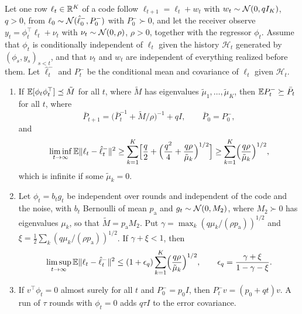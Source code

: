 \begin{theorem}\label{thm:lrn-tracking}
Let one row $\ell_t\in\mathbb{R}^K$ of a code follow $\ell_{t+1}=\ell_t+w_t$ with $w_t\sim\mathcal{N}(0,qI_K)$, $q>0$, from $\ell_0\sim\mathcal{N}(\hat\ell^-_0,P^-_0)$ with $P^-_0\succ0$, and let the receiver observe $y_t=\phi_t^\top\ell_t+\nu_t$ with $\nu_t\sim\mathcal{N}(0,\rho)$, $\rho>0$, together with the regressor $\phi_t$. Assume that $\phi_t$ is conditionally independent of $\ell_t$ given the history $\mathcal H_t$ generated by $(\phi_s,y_s)_{s<t}$, and that $\nu_t$ and $w_t$ are independent of everything realized before them. Let $\hat\ell^-_t$ and $P^-_t$ be the conditional mean and covariance of $\ell_t$ given $\mathcal H_t$.
\begin{enumerate}
\item[(a)] If $\mathbb{E}[\phi_t\phi_t^\top]\preceq\tilde M$ for all $t$, where $\tilde M$ has eigenvalues $\tilde\mu_1,\dots,\tilde\mu_K$, then $\mathbb{E} P^-_t\succeq\bar P_t$ for all $t$, where
\begin{equation}\label{eq:lrn-floor-recursion}
\bar P_{t+1}=\bigl(\bar P_t^{-1}+\tilde M/\rho\bigr)^{-1}+qI,\qquad\bar P_0=P^-_0,
\end{equation}
and
\begin{equation}\label{eq:lrn-floor}
\liminf_{t\to\infty}\mathbb{E}\Vert\ell_t-\hat\ell^-_t\Vert^2\ge\sum_{k=1}^K\Bigl[\frac q2+\Bigl(\frac{q^2}{4}+\frac{q\rho}{\tilde\mu_k}\Bigr)^{1/2}\Bigr]\ge\sum_{k=1}^K\Bigl(\frac{q\rho}{\tilde\mu_k}\Bigr)^{1/2},
\end{equation}
which is infinite if some $\tilde\mu_k=0$.
\item[(b)] Let $\phi_t=b_tg_t$ be independent over rounds and independent of the code and the noise, with $b_t$ Bernoulli of mean $p_{\mathrm a}$ and $g_t\sim\mathcal{N}(0,M_2)$, where $M_2\succ0$ has eigenvalues $\mu_k$, so that $\tilde M=p_{\mathrm a}M_2$. Put $\gamma=\max_k(q\mu_k/(\rho p_{\mathrm a}))^{1/2}$ and $\xi=\tfrac12\sum_k(q\mu_k/(\rho p_{\mathrm a}))^{1/2}$. If $\gamma+\xi<1$, then
\begin{equation}\label{eq:lrn-tracking-upper}
\limsup_{t\to\infty}\mathbb{E}\Vert\ell_t-\hat\ell^-_t\Vert^2\le(1+\epsilon_q)\sum_{k=1}^K\Bigl(\frac{q\rho}{\tilde\mu_k}\Bigr)^{1/2},\qquad\epsilon_q=\frac{\gamma+\xi}{1-\gamma-\xi}.
\end{equation}
\item[(c)] If $v^\top\phi_t=0$ almost surely for all $t$ and $P^-_0=p_0I$, then $P^-_tv=(p_0+qt)v$. A run of $\tau$ rounds with $\phi_t=0$ adds $q\tau I$ to the error covariance.
\end{enumerate}
\end{theorem}

